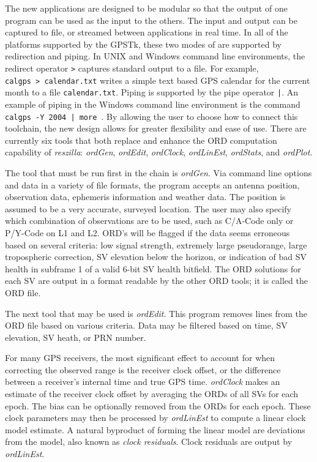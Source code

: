 \documentclass[letterpaper,ugly,10pt]{ion-gps}
\newcommand{\gpstkapp}[1]{\textit{\mbox{#1}}}
\newcommand{\gpstkdir}[1]{\texttt{\mbox{#1}}}
\newcommand{\gpstkcommand}[1]{\texttt{\mbox{#1}}}
\begin{document}
The new applications are designed to be modular so that the output of one program can be used as the input to the others. The input and output can be captured to file, or streamed between applications in real time. In all of the platforms supported by the GPSTk, these two modes of are supported by redirection and piping. In UNIX and Windows command line environments, the redirect operator \gpstkcommand{>} captures standard output to a file. For example, 
\gpstkcommand{calgps > calendar.txt} writes a simple text based GPS calendar for the current month to a file \gpstkdir{calendar.txt}. Piping is supported by the pipe operator \gpstkcommand{|}. An example of piping in the Windows command line environment is the command \gpstkcommand{calgps -Y 2004 | more }. By allowing the user to choose how to connect this toolchain, the new design allows for greater flexibility and ease of use. There are currently six tools that both replace and enhance the ORD computation capability of \gpstkapp{reszilla}: \gpstkapp{ordGen}, \gpstkapp{ordEdit}, \gpstkapp{ordClock}, \gpstkapp{ordLinEst}, \gpstkapp{ordStats}, and \gpstkapp{ordPlot}.

The tool that must be run first in the chain is \gpstkapp{ordGen}. Via command line options and data in a variety of file formats, the program accepts an antenna position, observation data, ephemeris information and weather data. The position is assumed to be a very accurate, surveyed location. The user may also specify which combination of observations are to be used, such as C/A-Code only or P/Y-Code on L1 and L2. ORD's will be flagged if the data seems erroneous based on several criteria: low signal strength, extremely large pseudorange, large tropospheric correction, SV elevation below the horizon, or indication of bad SV health in subframe 1 of a valid 6-bit SV health bitfield. The ORD solutions for each SV are output in a format readable by the other ORD tools; it is called the ORD file.

The next tool that may be used is \gpstkapp{ordEdit}. This program removes lines from the ORD file based on various criteria. Data may be filtered based on time, SV elevation, SV heath, or PRN number. 

For many GPS receivers, the most significant effect to account for when correcting the observed range is the receiver clock offset, or the difference between a receiver's internal time and true GPS time.  \gpstkapp{ordClock} makes an estimate of the receiver clock offset by averaging the ORDs of all SVs for each epoch. The bias can be optionally removed from the ORDs for each epoch. These clock parameters may then be processed by \gpstkapp{ordLinEst} to compute a linear clock model estimate. A natural byproduct of forming the linear model are deviations from the model, also known as \emph{clock residuals}. Clock residuals are output by \gpstkapp{ordLinEst}.
\end{document}
